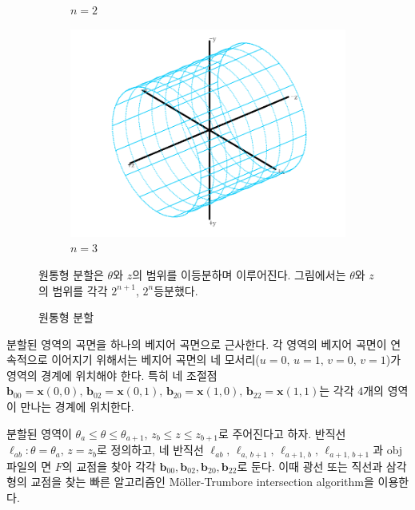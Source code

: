 \documentclass{gshs_thesis}
\theoremstyle{theorem}
\theoremstyle{lemma}
\theoremstyle{definition}
\begin{document}
\begin{figure}[h]
\begin{center}
\begin{subfigure}{.3\textwidth}
			\caption{$n=2$}
		\end{subfigure}
		\begin{subfigure}{.3\textwidth}
			\includegraphics[width=\textwidth]{image/subdivision3}
			\caption{$n=3$}
		\end{subfigure}
	\end{center} 
    \caption{원통형 분할}
	\raggedright \small 원통형 분할은 $\theta$와 $z$의 범위를 이등분하며 이루어진다. 그림에서는 $\theta$와 $z$의 범위를 각각 $2^{n+1}$, $2^n$등분했다. 
\end{figure}

분할된 영역의 곡면을 하나의 베지어 곡면으로 근사한다. 각 영역의 베지어 곡면이 연속적으로 이어지기 위해서는 베지어 곡면의 네 모서리($u=0, \, u=1, \, v=0, \, v=1$)가 영역의 경계에 위치해야 한다. 특히 네 조절점 $\mathbf{b}_{00} = \mathbf{x}(0, 0), \, \mathbf{b}_{02} = \mathbf{x}(0, 1), \, \mathbf{b}_{20} = \mathbf{x}(1, 0), \, \mathbf{b}_{22} = \mathbf{x}(1, 1)$는 각각 4개의 영역이 만나는 경계에 위치한다. 

분할된 영역이 $\theta_a \leq \theta \leq \theta_{a+1}, \, z_b \leq z \leq z_{b+1}$로 주어진다고 하자. 반직선 $\ell_{ab} \colon \theta = \theta_a, \, z = z_b$로 정의하고, 네 반직선 $\ell_{ab}, \, \ell_{a, \, b+1}, \, \ell_{a+1, \, b}, \, \ell_{a+1, \, b+1}$과 obj파일의 면 $F$의 교점을 찾아 각각 $\mathbf{b}_{00}, \mathbf{b}_{02}, \mathbf{b}_{20}, \mathbf{b}_{22}$로 둔다. 이때 광선 또는 직선과 삼각형의 교점을 찾는 빠른 알고리즘인 Möller-Trumbore intersection algorithm을 이용한다. \cite{raytriangle}
\end{document}
